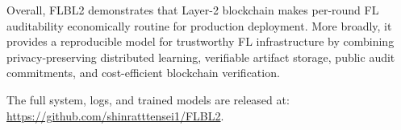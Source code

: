 \documentclass{llncs}
\begin{document}
Overall, FLBL2 demonstrates that Layer-2 blockchain makes per-round FL auditability economically routine for production deployment. More broadly, it provides a reproducible model for trustworthy FL infrastructure by combining privacy-preserving distributed learning, verifiable artifact storage, public audit commitments, and cost-efficient blockchain verification.

The full system, logs, and trained models are released at:
\url{https://github.com/shinratttensei1/FLBL2}.



\end{document}
